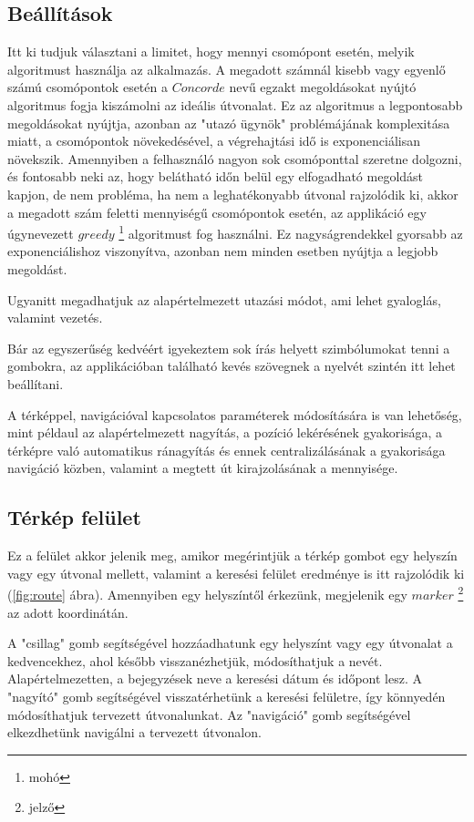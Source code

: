 \subsection{Beállítások}

Itt ki tudjuk választani a limitet, hogy mennyi csomópont esetén, melyik algoritmust használja az alkalmazás. A megadott számnál kisebb vagy egyenlő számú csomópontok esetén a \(Concorde\) nevű egzakt megoldásokat nyújtó algoritmus fogja kiszámolni az ideális útvonalat. Ez az algoritmus a legpontosabb megoldásokat nyújtja, azonban az "utazó ügynök" problémájának komplexitása miatt, a csomópontok növekedésével, a végrehajtási idő is exponenciálisan növekszik. Amennyiben a felhasználó nagyon sok csomóponttal szeretne dolgozni, és fontosabb neki az, hogy belátható időn belül egy elfogadható megoldást kapjon, de nem probléma, ha nem a leghatékonyabb útvonal rajzolódik ki, akkor a megadott szám feletti mennyiségű csomópontok esetén, az applikáció egy úgynevezett \(greedy\)%
\footnote{ %
	mohó
}  %
 algoritmust fog használni. Ez nagyságrendekkel gyorsabb az exponenciálishoz viszonyítva, azonban nem minden esetben nyújtja a legjobb megoldást.

Ugyanitt megadhatjuk az alapértelmezett utazási módot, ami lehet gyaloglás, valamint vezetés.

Bár az egyszerűség kedvéért igyekeztem sok írás helyett szimbólumokat tenni a gombokra, az applikációban található kevés szövegnek a nyelvét szintén itt lehet beállítani.

A térképpel, navigációval kapcsolatos paraméterek módosítására is van lehetőség, mint példaul az alapértelmezett nagyítás, a pozíció lekérésének gyakorisága, a térképre való automatikus ránagyítás és ennek centralizálásának a gyakorisága navigáció közben, valamint a megtett út kirajzolásának a mennyisége.

\subsection{Térkép felület}

Ez a felület akkor jelenik meg, amikor megérintjük a térkép gombot egy helyszín vagy egy útvonal mellett, valamint a keresési felület eredménye is itt rajzolódik ki (\ref{fig:route} ábra).
Amennyiben egy helyszíntől érkezünk, megjelenik egy \(marker\)%
\footnote{ %
	jelző
}  %
az adott koordinátán.

A "csillag" gomb segítségével hozzáadhatunk egy helyszínt vagy egy útvonalat a kedvencekhez, ahol később visszanézhetjük, módosíthatjuk a nevét. Alapértelmezetten, a bejegyzések neve a keresési dátum és időpont lesz. A "nagyító" gomb segítségével visszatérhetünk a keresési felületre, így könnyedén módosíthatjuk tervezett útvonalunkat. Az "navigáció" gomb segítségével elkezdhetünk navigálni a tervezett útvonalon.

